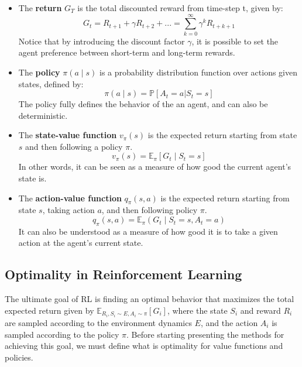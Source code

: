\begin{itemize}
\item
	The \textbf{return} $G_T$ is the total discounted reward from time-step t, given by:
	\begin{equation}
	G_t = R_{t+1} + \gamma R_{t+2} + ... = \sum_{k=0}^{\infty}{\gamma^k R_{t+k+1}}
	\end{equation}
	Notice that by introducing the discount factor $\gamma$, it is possible to set the agent preference between short-term and long-term rewards.
\item
	The \textbf{policy} $\pi(a \mid s)$ is a probability distribution function over actions given states, defined by:
	\begin{equation}
	\pi(a \mid s) = \mathbb{P}[A_t=a | S_t=s]
	\end{equation}
	The policy fully defines the behavior of the an agent, and can also be deterministic.
\item
	The \textbf{state-value function} $v_{\pi}(s)$ is the expected return starting from state $s$ and then following a policy $\pi$.
	\begin{equation}
	v_{\pi}(s) = \mathbb{E}_{\pi}[G_t \mid S_t = s]
	\label{eq:state_value_function_definition}
	\end{equation}
	In other words, it can be seen as a measure of how good the current agent's state is.
\item
	The \textbf{action-value function} $q_{\pi}(s,a)$ is the expected return starting from state $s$, taking action $a$, and then following policy $\pi$.
	\begin{equation}
	q_{\pi}(s,a) = \mathbb{E}_{\pi}(G_t \mid S_t = s, A_t = a)
	\label{eq:action_value_function_definition}
	\end{equation}
	It can also be understood as a measure of how good it is to take a given action at the agent's current state.
\end{itemize}

\subsection{Optimality in Reinforcement Learning}

The ultimate goal of RL is finding an optimal behavior that maximizes the total expected return given by $\mathbb{E}_{R_i,S_i \sim E, A_i \sim \pi}[G_i]$, where the state $S_i$ and reward $R_i$ are sampled according to the environment dynamics $E$, and the action $A_i$ is sampled according to the policy $\pi$. Before starting presenting the methods for achieving this goal, we must define what is optimality for value functions and policies.

